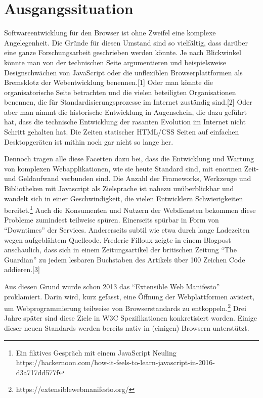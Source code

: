 \section{Ausgangssituation}\label{ausgangssituation}

Softwareentwicklung für den Browser ist ohne Zweifel eine komplexe
Angelegenheit. Die Gründe für diesen Umstand sind so vielfältig, dass
darüber eine ganze Forschungsarbeit geschrieben werden könnte. Je nach
Blickwinkel könnte man von der technischen Seite argumentieren und
beispielsweise Designschwächen von JavaScript oder die unflexiblen
Browserplattformen als Bremsklotz der Webentwicklung benennen.{[}1{]}
Oder man könnte die organisatorische Seite betrachten und die vielen
beteiligten Organisationen benennen, die für Standardisierungsprozesse
im Internet zuständig sind.{[}2{]} Oder aber man nimmt die historische
Entwicklung in Augenschein, die dazu geführt hat, dass die technische
Entwicklung der rasanten Evolution im Internet nicht Schritt gehalten
hat. Die Zeiten statischer HTML/CSS Seiten auf einfachen Desktopgeräten
ist mithin noch gar nicht so lange her.

Dennoch tragen alle diese Facetten dazu bei, dass die Entwicklung und
Wartung von komplexen Webapplikationen, wie sie heute Standard sind, mit
enormen Zeit- und Geldaufwand verbunden sind. Die Anzahl der Frameworks,
Werkzeuge und Bibliotheken mit Javascript als Zielsprache ist nahezu
unüberblickbar und wandelt sich in einer Geschwindigkeit, die vielen
Entwicklern Schwierigkeiten bereitet.\footnote{Ein fiktives Gespräch mit
  einem JavaScript Neuling
  https://hackernoon.com/how-it-feels-to-learn-javascript-in-2016-d3a717dd577f}
Auch die Konsumenten und Nutzern der Webdiensten bekommen diese Probleme
zumindest teilweise spüren. Einerseits spürbar in Form von ``Downtimes''
der Services. Andererseits subtil wie etwa durch lange Ladezeiten wegen
aufgeblähtem Quellcode. Frederic Filloux zeigte in einem Blogpost
anschaulich, dass sich in einem Zeitungsartikel der britischen Zeitung
``The Guardian'' zu jedem lesbaren Buchstaben des Artikels über 100
Zeichen Code addieren.{[}3{]}

Aus diesen Grund wurde schon 2013 das ``Extensible Web Manifesto''
proklamiert. Darin wird, kurz gefasst, eine Öffnung der Webplattformen
avisiert, um Webprogrammierung teilweise von Browserstandards zu
entkoppeln.\footnote{https://extensiblewebmanifesto.org/} Drei Jahre
später sind diese Ziele in W3C Spezifikationen konkretisiert worden.
Einige dieser neuen Standards werden bereits nativ in (einigen) Browsern
unterstützt.

